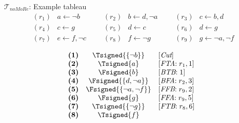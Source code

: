 \begin{frame}{$\mathcal{T}_{\textit{noMoRe}}$: Example tableau}
\small
\[
\begin{array}{llllllllllll}
(r_1)  &  a \leftarrow \neg b                  & & &
(r_2)  &  b \leftarrow d, \neg a               & & &
(r_3)  &  c \leftarrow b, d                            \\
(r_4)  &  c \leftarrow g                               & & &
(r_5)  &  d \leftarrow c                               & & &
(r_6)  &  d \leftarrow g                               \\
(r_7)  &  e \leftarrow f, \neg c               & & &
(r_8)  &  f \leftarrow \neg g                  & & &
(r_9)  &  g \leftarrow \neg a, \neg f
\end{array}
\]
\begin{center}
\hspace*{-15pt}
\begin{minipage}[t]{16cm}
\tiny
\begin{minipage}[t]{4.5cm}
\[
\hspace{-0.2cm}
\begin{array}{lcl}
\textbf{(1)}                                       &
  \Tsigned{\{\neg b\}}                     &
  [\textit{Cut}]                                   \\
\textbf{(2)}                                       &
  \Tsigned{a}                                      &
  [\textit{FTA}{:}\; r_1, \text{1}]                \\
\textbf{(3)}                                       &
  \Fsigned{b}                                      &
  [\textit{BTB}{:}\; \text{1}]                     \\
\textbf{(4)}                                       &
  \Fsigned{\{d,\neg a\}}                   &
  [\textit{BFA}{:}\;r_2, \text{3}]                 \\
\textbf{(5)}                                       &
  \Fsigned{\{\neg a,\neg f\}}      &
  [\textit{FFB}{:}\;r_9, \text{2}]                 \\
\textbf{(6)}                                       &
  \Fsigned{g}                                      &
  [\textit{FFA}{:}\;r_9, \text{5}]                 \\
\textbf{(7)}                                       &
  \Tsigned{\{\neg g\}}                     &
  [\textit{FTB}{:}\;r_8, \text{6}]                 \\
\textbf{(8)}                                       &
  \Tsigned{f}                                      &

\end{array}\]
\end{minipage}
\end{minipage}
\end{center}
\end{frame}
